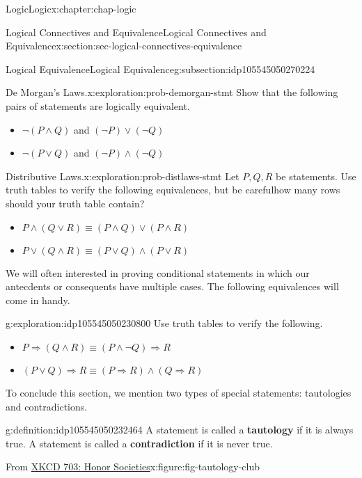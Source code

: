 \documentclass[oneside,10pt,]{book}
\newcommand{\terminology}[1]{\textbf{#1}}
\begin{document}
\begin{chapterptx}{Logic}{}{Logic}{}{}{x:chapter:chap-logic}
\begin{sectionptx}{Logical Connectives and Equivalence}{}{Logical Connectives and Equivalence}{}{}{x:section:sec-logical-connectives-equivalence}
\begin{subsectionptx}{Logical Equivalence}{}{Logical Equivalence}{}{}{g:subsection:idp105545050270224}
\begin{exploration}{De Morgan's Laws.}{x:exploration:prob-demorgan-stmt}%
Show that the following pairs of statements are logically equivalent.%
%
\begin{itemize}[label=\textbullet]
\item{}\(\neg (P\land Q)\) and \((\neg P) \lor (\neg Q)\)%
\item{}\(\neg (P\lor Q)\) and \((\neg P)\land (\neg Q)\)%
\end{itemize}
\end{exploration}%
\begin{exploration}{Distributive Laws.}{x:exploration:prob-distlaws-stmt}%
Let \(P, Q, R\) be statements. Use truth tables to verify the following equivalences, but be careful\textemdash{}how many rows should your truth table contain?%
%
\begin{itemize}[label=\textbullet]
\item{}\(\displaystyle P\land (Q\lor R) \equiv (P\land Q) \lor (P \land R)\)%
\item{}\(\displaystyle P\lor (Q\land R) \equiv (P \lor Q)\land (P \lor R)\)%
\end{itemize}
\end{exploration}%
We will often interested in proving conditional statements in which our antecdents or consequents have multiple cases. The following equivalences will come in handy.%
\begin{exploration}{}{g:exploration:idp105545050230800}%
Use truth tables to verify the following.%
%
\begin{itemize}[label=\textbullet]
\item{}\(\displaystyle P\Rightarrow (Q\land R) \equiv (P\land \neg Q)\Rightarrow R\)%
\item{}\(\displaystyle (P\lor Q)\Rightarrow R \equiv (P\Rightarrow R)\land (Q\Rightarrow R)\)%
\end{itemize}
\end{exploration}%
To conclude this section, we mention two types of special statements: tautologies and contradictions.%
\begin{definition}{}{g:definition:idp105545050232464}%
%
%
A statement is called a \terminology{tautology} if it is always true. A statement is called a \terminology{contradiction} if it is never true.%
\end{definition}
\begin{figureptx}{From \href{https://xkcd.com/703/}{XKCD 703: Honor Societies}\protect\footnotemark{}}{x:figure:fig-tautology-club}{}%

\end{figureptx}
\end{subsectionptx}
\end{sectionptx}
\end{chapterptx}
\end{document}
